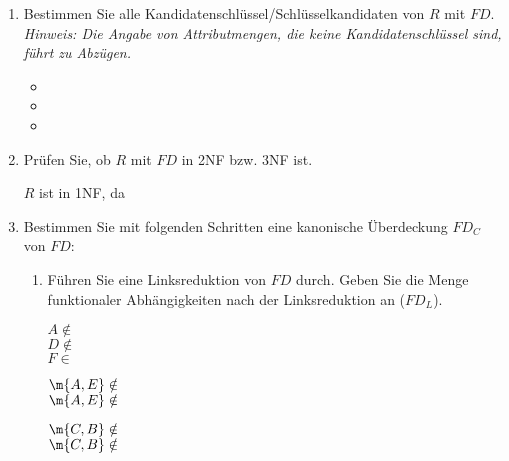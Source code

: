 \documentclass{lehramt-informatik-aufgabe}
\begin{document}
\begin{enumerate}


\item Bestimmen Sie alle Kandidatenschlüssel/Schlüsselkandidaten von $R$
mit $FD$. \textit{Hinweis: Die Angabe von Attributmengen, die keine
Kandidatenschlüssel sind, führt zu Abzügen.}

\begin{liAntwort}
\begin{itemize}
\item {}
\item {}
\item {}
\end{itemize}
\end{liAntwort}


\item Prüfen Sie, ob $R$ mit $FD$ in 2NF bzw. 3NF ist.

\begin{liAntwort}
$R$ ist in 1NF, da 
\end{liAntwort}


\item Bestimmen Sie mit folgenden Schritten eine kanonische Überdeckung
$FD_C$ von $FD$:

\begin{enumerate}


\item Führen Sie eine Linksreduktion von $FD$ durch. Geben Sie die Menge
funktionaler Abhängigkeiten nach der Linksreduktion an ($FD_L$).

\begin{liAntwort}


$A \notin$ \\
$D \notin$  \\
$F \in$ 


$\m{A, E} \notin$ \\
$\m{A, E} \notin$ 


$\m{C, B} \notin$ \\
$\m{C, B} \notin$ 


\end{liAntwort}
\end{enumerate}
\end{enumerate}
\end{document}
